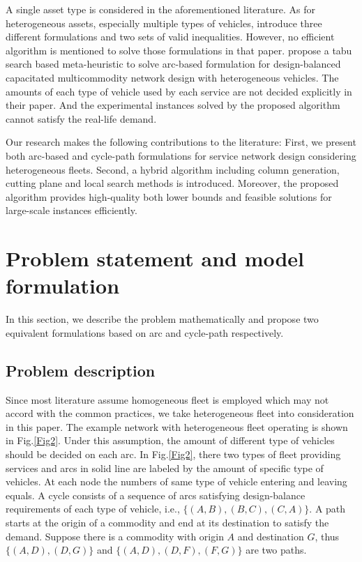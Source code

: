 \documentclass[11pt,nonblindrev,fleqn]{article}
\begin{document}
A single asset type is considered in the aforementioned literature. As for heterogeneous assets, especially multiple types of vehicles, \cite{Kim1999Multimodal} introduce three different formulations and two sets of valid inequalities. However, no efficient algorithm is mentioned to solve those formulations in that paper. \cite{Li2016Design} propose a tabu search based meta-heuristic to solve arc-based formulation for design-balanced capacitated multicommodity network design with heterogeneous vehicles. The amounts of each type of vehicle used by each service are not decided explicitly in their paper. And the experimental instances solved by the proposed algorithm cannot satisfy the real-life demand.

Our research makes the following contributions to the literature: First, we present both arc-based and cycle-path formulations for service network design considering heterogeneous fleets. Second, a hybrid algorithm including column generation, cutting plane and local search methods is introduced. Moreover, the proposed algorithm provides high-quality both lower bounds and feasible solutions for large-scale instances efficiently.

\section{Problem statement and model formulation}
In this section, we describe the problem mathematically and propose two equivalent formulations based on arc and cycle-path respectively. 

\subsection{Problem description}
Since most literature assume homogeneous fleet is employed which may not accord with the common practices, we take heterogeneous fleet into consideration in this paper. The example network with heterogeneous fleet operating is shown in Fig.\ref{Fig2}. Under this assumption, the amount of different type of vehicles should be decided on each arc. In Fig.\ref{Fig2}, there two types of fleet providing services and arcs in solid line are labeled by the amount of specific type of vehicles. At each node the numbers of same type of vehicle entering and leaving equals. A cycle consists of a sequence of arcs satisfying design-balance requirements of each type of vehicle, i.e., $\{ (A,B),(B,C),(C,A) \}$. A path starts at the origin of a commodity and end at its destination to satisfy the demand. Suppose there is a commodity with origin $A$ and destination $G$, thus $\{ (A,D),(D,G) \}$ and $\{ (A,D),(D,F),(F,G) \}$ are two paths.
\end{document}

